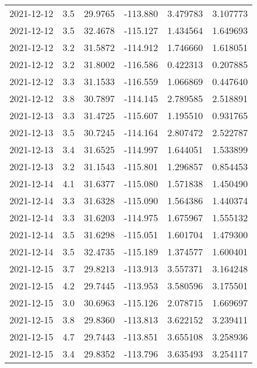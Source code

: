 \begin{tabular}{lrrrrr}
2021-12-12 &       3.5 &  29.9765 &  -113.880 &         3.479783 &         3.107773 \\
2021-12-12 &       3.5 &  32.4678 &  -115.127 &         1.434564 &         1.649693 \\
2021-12-12 &       3.2 &  31.5872 &  -114.912 &         1.746660 &         1.618051 \\
2021-12-12 &       3.2 &  31.8002 &  -116.586 &         0.422313 &         0.207885 \\
2021-12-12 &       3.3 &  31.1533 &  -116.559 &         1.066869 &         0.447640 \\
2021-12-12 &       3.8 &  30.7897 &  -114.145 &         2.789585 &         2.518891 \\
2021-12-13 &       3.3 &  31.4725 &  -115.607 &         1.195510 &         0.931765 \\
2021-12-13 &       3.5 &  30.7245 &  -114.164 &         2.807472 &         2.522787 \\
2021-12-13 &       3.4 &  31.6525 &  -114.997 &         1.644051 &         1.533899 \\
2021-12-13 &       3.2 &  31.1543 &  -115.801 &         1.296857 &         0.854453 \\
2021-12-14 &       4.1 &  31.6377 &  -115.080 &         1.571838 &         1.450490 \\
2021-12-14 &       3.3 &  31.6328 &  -115.090 &         1.564386 &         1.440374 \\
2021-12-14 &       3.3 &  31.6203 &  -114.975 &         1.675967 &         1.555132 \\
2021-12-14 &       3.5 &  31.6298 &  -115.051 &         1.601704 &         1.479300 \\
2021-12-14 &       3.5 &  32.4735 &  -115.189 &         1.374577 &         1.600401 \\
2021-12-15 &       3.7 &  29.8213 &  -113.913 &         3.557371 &         3.164248 \\
2021-12-15 &       4.2 &  29.7445 &  -113.953 &         3.580596 &         3.175501 \\
2021-12-15 &       3.0 &  30.6963 &  -115.126 &         2.078715 &         1.669697 \\
2021-12-15 &       3.8 &  29.8360 &  -113.813 &         3.622152 &         3.239411 \\
2021-12-15 &       4.7 &  29.7443 &  -113.851 &         3.655108 &         3.258936 \\
2021-12-15 &       3.4 &  29.8352 &  -113.796 &         3.635493 &         3.254117 \\

\end{tabular}
